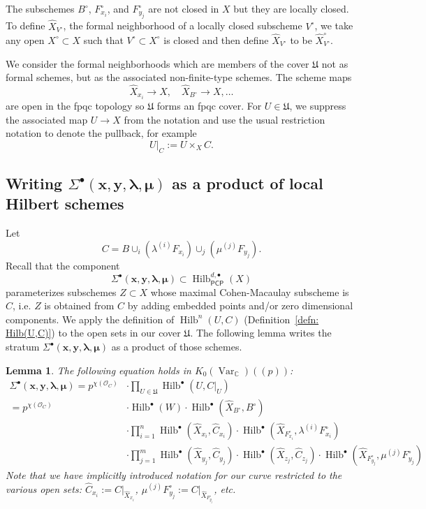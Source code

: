 \documentclass[12pt]{amsart}
\newtheorem{lemma}[theorem]{Lemma}
\theoremstyle{definition}
\newcommand{\CC} {\mathbb{C}}          %
\renewcommand{\O}{\mathcal{O}}
\newcommand{\Hilb}{\operatorname{Hilb}}
\newcommand{\Var}{\operatorname{Var}}
\newcommand{\boldx}{\boldsymbol{x}}
\newcommand{\boldy}{\boldsymbol{y}}
\newcommand{\boldlambda}{\boldsymbol{\lambda }}
\newcommand{\boldmu}{\boldsymbol{\mu }}
\newcommand{\Sigmaxylambdamu}{\Sigma^{\bullet }(\boldx ,\boldy ,\boldlambda ,\boldmu )}
\renewcommand{\hat}{\widehat}
\newcommand{\Xhat}{\widehat{X}}
\newcommand{\PCP}{\mathsf{PCP}}
\begin{document}
The subschemes $B^{\circ}$, $F_{x_{i}}^{\circ}$, and
$F_{y_{j}}^{\circ}$ are not closed in $X$ but they are locally
closed. To define $\Xhat_{V^{\circ}}$, the formal neighborhood of a
locally closed subscheme $V^{\circ}$, we take any open
$X^{\circ}\subset X$ such that $V^{\circ}\subset X^{\circ}$ is closed
and then define $\Xhat_{V^{\circ}}$ to be $\Xhat^{\circ}_{V^{\circ}}$.

We consider the formal neighborhoods which are members of the cover
$\mathfrak{U}$ not as formal schemes, but as the associated
non-finite-type schemes. The scheme maps
\[
\Xhat_{x_{i}}\to X, \quad \Xhat_{B^{\circ}}\to X, \dotsc 
\]
are open in the fpqc topology \cite[Tag 0BNH,
c.f.~Ex.50.15.3(5)]{stacks-project} so $\mathfrak{U}$ forms an fpqc
cover. For $U\in \mathfrak{U}$, we suppress the associated map $U\to
X$ from the notation and use the usual restriction notation to denote
the pullback, for example
\[
U|_{C}:=U\times_{X}C. 
\]

\subsection{Writing
$\Sigmaxylambdamu $
as a product of local Hilbert schemes}\label{subsec: products of local
Hilbert schemes} 
Let 
\[
C=B\cup_{i}\left(\lambda^{(i)}F_{x_{i}}
\right)\cup_{j}\left(\mu^{(j)}F_{y_{j}} \right).
\]
Recall that the component
\[
\Sigmaxylambdamu \subset \Hilb^{d,\bullet}_{\PCP}(X)
\]
parameterizes subschemes $Z\subset X$ whose maximal Cohen-Macaulay
subscheme is $C$, i.e. $Z$ is obtained from $C$ by adding embedded
points and/or zero dimensional components. We apply the definition of
$\Hilb^{n}(U,C)$ (Definition~\ref{defn: Hilb(U,C)}) to the open sets
in our cover $\mathfrak{U}$. The following lemma writes the stratum
$\Sigma^{\bullet}(\boldx ,\boldy ,\boldlambda ,\boldmu ) $ as a
product of those schemes.
\begin{lemma}\label{lem: Sigma = product of local Hilbert schemes}
The following equation holds in $K_{0}(\Var_{\CC})(\!(p)\!)$:
\begin{align*}
\Sigmaxylambdamu = p^{\chi
(\O_{C})}&\cdot  \prod_{U\in \mathfrak{U}} \Hilb^{\bullet}(U,C|_{U})\\
=p^{\chi (\O_{C})}& \cdot  \Hilb^{\bullet}(W)\cdot
\Hilb^{\bullet}(\Xhat_{B^{\circ }},B^{\circ})\\
&\cdot \prod_{i=1}^{n}
\Hilb^{\bullet}(\Xhat_{x_{i}},\hat{C}_{x_{i}})\cdot
\Hilb^{\bullet}(\Xhat_{F^{\circ }_{x_{i}}},\lambda^{(i)}F^{\circ}_{x_{i}})\\
&\cdot \prod_{j=1}^{m}
\Hilb^{\bullet}(\Xhat_{y_{j}},\hat{C}_{y_{j}})\cdot
\Hilb^{\bullet}(\Xhat_{z_{j}},\hat{C}_{z_{j}})\cdot
\Hilb^{\bullet}(\Xhat_{F^{\circ }_{y_{j}}},\mu^{(j)}F^{\circ}_{y_{j}})
\end{align*}
Note that we have implicitly introduced notation for our curve
restricted to the various open sets: $\hat{C}_{x_{i}}:=C|_{\Xhat_{x_{i}}}$,
$ \mu^{(j)}F^{\circ}_{y_{j}}:=C|_{\Xhat_{F^{\circ }_{y_{j}}}}$, etc.
\end{lemma}
\end{document}
